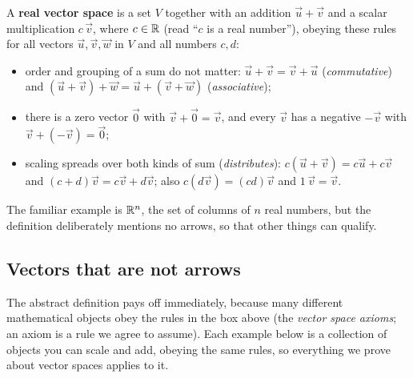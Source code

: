 \begin{formalbox}
A \textbf{real vector space} is a set $V$ together with an addition $\vec u + \vec v$ and a scalar
multiplication $c\,\vec v$, where $c\in\mathbb{R}$ (read ``$c$ is a real number''), obeying these rules for all
vectors $\vec u,\vec v,\vec w$ in $V$ and all numbers $c,d$:
\begin{itemize}
  \item order and grouping of a sum do not matter: $\vec u+\vec v=\vec v+\vec u$ (\emph{commutative})
  and $(\vec u+\vec v)+\vec w=\vec u+(\vec v+\vec w)$ (\emph{associative});
  \item there is a zero vector $\vec 0$ with $\vec v + \vec 0 = \vec v$, and every $\vec v$ has a
  negative $-\vec v$ with $\vec v+(-\vec v)=\vec 0$;
  \item scaling spreads over both kinds of sum (\emph{distributes}): $c(\vec u+\vec v)=c\vec u + c\vec v$
  and $(c+d)\vec v = c\vec v + d\vec v$; also $c(d\vec v)=(cd)\vec v$ and $1\,\vec v = \vec v$.
\end{itemize}
The familiar example is
$\mathbb{R}^n$, the set of columns of $n$ real numbers, but the definition deliberately mentions no arrows,
so that other things can qualify.
\end{formalbox}

\subsection{Vectors that are not arrows}

The abstract definition pays off immediately, because many different mathematical objects obey the
rules in the box above (the \emph{vector space axioms}; an axiom is a rule we agree to assume). Each
example below is a collection of objects you can scale and add, obeying the same rules, so everything
we prove about vector spaces applies to it.

